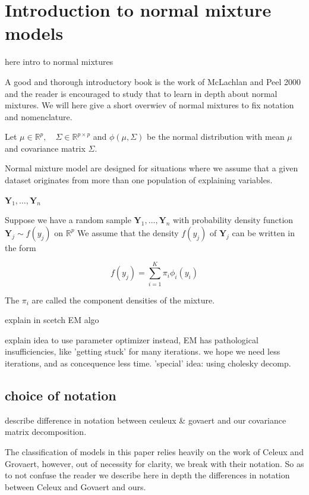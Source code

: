 \chapter{Introduction to normal mixture models}%

here intro to normal mixtures

A good and thorough introductory book is the work of McLachlan and Peel 2000 and
the reader is encouraged to study that to learn in depth about normal mixtures. 
We will here give a short overwiev of normal mixtures to fix notation and nomenclature.

Let $ \mu \in \mathbb{R}^p , \quad \Sigma \in \mathbb{R}^{p \times p} $ and 
$ \phi(\mu, \Sigma) $ be the normal distribution with
mean $ \mu $ and covariance matrix $ \Sigma $.

Normal mixture model are designed for situations where we assume that a given 
dataset originates from more than one population of explaining variables.

$ \pmb{Y}_1, \dots , \pmb{Y}_n $

\begin{definition}
    Suppose we have a random sample $ \pmb{Y}_1, \dots , \pmb{Y}_n $ with 
    probability density function $ \pmb{Y}_j \sim f(y_j) $ on $\mathbb{R}^p$
    We assume that the density $ f(y_j) $ of $ \pmb{Y}_j $ can be written in
    the form 

    \[ f(y_j) = \sum_{i=1}^{K} \pi_i \phi_i (y_i) \]

    The $ \pi_i $ are called the component densities of the mixture.
\end{definition}

explain in scetch EM algo

explain idea to use parameter optimizer instead,
EM has pathological insufficiencies, like 'getting stuck' for many iterations.
we hope we need less iterations, and as concequence less time.
'special' idea: using cholesky decomp.


\section{choice of notation}

describe difference in notation between ceuleux \& govaert and our covariance matrix decomposition.

The classification of models in this paper relies heavily on the work of Celeux and Grovaert,
however, out of necessity for clarity, we break with their notation. 
So as to not confuse the reader we describe here in depth the differences in notation
between Celeux and Govaert and ours.

